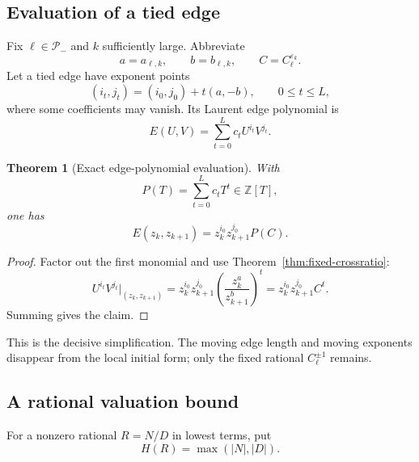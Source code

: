 \documentclass[11pt,oneside]{article}
\newtheorem{theorem}{Theorem}[section]
\theoremstyle{definition}
\theoremstyle{remark}
\newcommand{\Z}{\mathbb Z}
\newcommand{\eps}{\varepsilon}
\begin{document}
\subsection{Evaluation of a tied edge}

Fix $\ell\in\mathcal P_-$ and $k$ sufficiently large.  Abbreviate
\begin{equation}
 a=a_{\ell,k},\qquad b=b_{\ell,k},
 \qquad C=C_\ell^{\eps_k}.
 \label{eq:abc-short}
\end{equation}
Let a tied edge have exponent points
\begin{equation}
 (i_t,j_t)=(i_0,j_0)+t(a,-b),
 \qquad 0\le t\le L,
 \label{eq:edge-points}
\end{equation}
where some coefficients may vanish.  Its Laurent edge polynomial is
\begin{equation}
 E(U,V)=\sum_{t=0}^L c_tU^{i_t}V^{j_t}.
 \label{eq:edge-E}
\end{equation}

\begin{theorem}[Exact edge-polynomial evaluation]
\label{thm:edge-evaluation}
With
\begin{equation}
 P(T)=\sum_{t=0}^L c_tT^t\in\Z[T],
 \label{eq:edge-P}
\end{equation}
one has
\begin{equation}
 E(z_k,z_{k+1})
 =z_k^{i_0}z_{k+1}^{j_0}P(C).
 \label{eq:edge-evaluation}
\end{equation}
\end{theorem}

\begin{proof}
Factor out the first monomial and use Theorem~\ref{thm:fixed-crossratio}:
\[
 U^{i_t}V^{j_t}\big|_{(z_k,z_{k+1})}
 =z_k^{i_0}z_{k+1}^{j_0}
   \left(\frac{z_k^a}{z_{k+1}^b}\right)^t
 =z_k^{i_0}z_{k+1}^{j_0}C^t.
\]
Summing gives the claim.
\end{proof}

This is the decisive simplification.  The moving edge length and moving exponents disappear
from the local initial form; only the fixed rational $C_\ell^{\pm1}$ remains.

\subsection{A rational valuation bound}

For a nonzero rational $R=N/D$ in lowest terms, put
\begin{equation}
 H(R)=\max(|N|,|D|).
 \label{eq:mult-height}
\end{equation}
\end{document}
